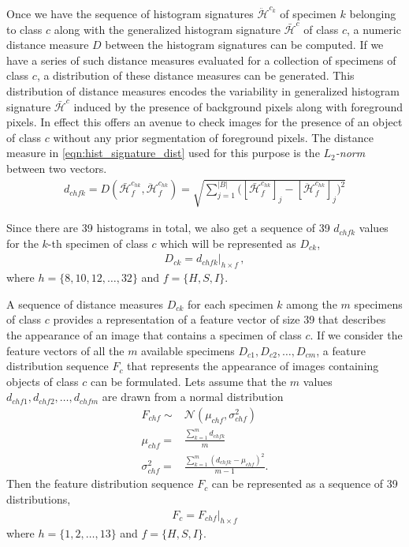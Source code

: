 \documentclass {udthesis}
\begin{document}
Once we have the sequence of histogram signatures $\ddot{\mathcal{H}}^{c_{k}}$ of specimen $k$ belonging to class $c$ along with the generalized histogram signature $\bar{\mathcal{H}}^{c}$ of class $c$, a numeric distance measure $D$ between the histogram signatures can be computed. If we have a series of such distance measures evaluated for a collection of specimens of class $c$, a distribution of these distance measures can be generated. This distribution 
of distance measures encodes the variability in generalized histogram signature $\bar{\mathcal{H}}^{c}$ induced by the presence of background pixels along with foreground pixels. In effect this offers an avenue to check images for the presence of an object of class $c$ without any prior segmentation of foreground pixels. The distance measure in  \eqref{eqn:hist_signature_dist} used for this purpose is the \emph{$L_2$-norm} between two vectors.
%
\begin{align}	\label{eqn:hist_signature_dist}
 d_{chfk} = D(\bar{\mathcal{H}}^{c_{hk}}_f, \ddot{\mathcal{H}}^{c_{hk}}_f) 
 = \sqrt{\sum_{j=1}^{|B|}\Bigg(\left[\bar{\mathcal{H}}^{c_{hk}}_f\right]_j
 -\left[\ddot{\mathcal{H}}^{c_{hk}}_f\right]_j\Bigg)^2}
\end{align}

Since there are 39 histograms in total, we also get a sequence of 39 $d_{chfk}$ values for the $k$-th specimen of class $c$ which will be represented as $D_{ck}$,
%
\begin{align}	\label{eqn:dist_sequence}
 D_{ck}=d_{chfk}\Big|_{h\times f}\,,
\end{align}
%
where $h=\{8,10,12, \ldots,32\}$ and $f=\{H,S,I\}$.

A sequence of distance measures $D_{ck}$ for each specimen $k$ among the $m$ specimens of class $c$ provides a representation of a feature vector of size 39 that describes the appearance of an image that contains a specimen of class $c$. If we consider the feature vectors of all the $m$ available specimens $D_{c1},D_{c2},\ldots,D_{cm}$, a feature distribution sequence $F_c$ that represents the appearance of images containing objects of class $c$ can be formulated. Lets assume that the $m$ values $d_{chf1}, d_{chf2},\ldots,d_{chfm}$ are drawn from a normal distribution 
%
\begin{align}
 F_{chf}\sim &\mathcal{N}(\mu_{chf},\sigma^2_{chf})\label{eqn:normal_distr}\\
 \mu_{chf}= &\frac{\sum_{k=1}^m d_{chfk}}{m}\label{eqn:normal_mean}\\
 \sigma^2_{chf}= &\frac{\sum_{k=1}^m (d_{chfk}-\mu_{chf})^2}{m-1}\label{eqn:normal_stddev}.
\end{align}
%
Then the feature distribution sequence $F_c$ can be represented as a sequence of 39 distributions,
\begin{align}	\label{eqn:feat_distribution}
 F_c=F_{chf}\Big|_{h \times f}
\end{align}
where $h=\{1,2,\ldots,13\}$ and $f=\{H,S,I\}$. 
\end{document}
